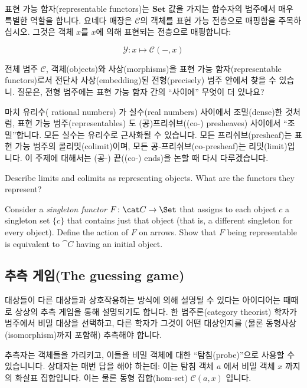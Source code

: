 \documentclass[DaoFP]{subfiles}
\begin{document}
표현 가능 함자(representable functors)는 $\mathbf{Set}$ 값을 가지는 함수자의 범주에서 매우 특별한 역할을 합니다. 요네다 매장은 $\mathcal{C}$의 객체를 표현 가능 전층으로 매핑함을 주목하십시오. 그것은 객체 $x$를 $x$에 의해 표현되는 전층으로 매핑합니다:

\[  \mathcal{Y} \colon x \mapsto \mathcal{C}(-, x) \]

전체 범주 $\mathcal{C}$, 객체(objects)와 사상(morphisms)을 표현 가능 함자(representable functors)로서 전단사 사상(embedding)된 전형(precisely) 범주 안에서 찾을 수 있습니.  
질문은, 전형 범주에는 표현 가능 함자 간의 ``사이에'' 무엇이 더 있나요?

마치 유리수( rational numbers) 가 실수(real numbers) 사이에서 조밀(dense)한 것처럼, 표현 가능 범주(representables) 도 (공)프리쉬브((co-) presheaves) 사이에서 ``조밀''합니다. 모든 실수는 유리수로 근사화될 수 있습니다. 모든 프리쉬브(presheaf)는 표현 가능 범주의 콜리밋(colimit)이며, 모든 공-프리쉬브(co-presheaf)는 리밋(limit)입니다. 이 주제에 대해서는 (공-) 끝((co-) ends)을 논할 때 다시 다루겠습니다.

\begin{exercise}
Describe limits and colimits as representing objects. What are the functors they represent?
\end{exercise}
\begin{exercise}
Consider a \emph{singleton functor} $F \colon \cat C \to \Set$ that assigns to each object $c$ a singleton set $\{c\}$ that contains just that object (that is, a different singleton for every object). Define the action of $F$ on arrows. Show that $F$ being representable is equivalent to $\cat C$ having an initial object.
\end{exercise}

\subsection{추측 게임(The guessing game)}

대상들이 다른 대상들과 상호작용하는 방식에 의해 설명될 수 있다는 아이디어는 때때로 상상의 추측 게임을 통해 설명되기도 합니다. 한 범주론(category theorist) 학자가 범주에서 비밀 대상을 선택하고, 다른 학자가 그것이 어떤 대상인지를 (물론 동형사상(isomorphism)까지 포함해) 추측해야 합니다.

추측자는 객체들을 가리키고, 이들을 비밀 객체에 대한 ``탐침(probe)''으로 사용할 수 있습니니다. 상대자는 매번 답을 해야 하는데: 이는 탐침 객체 $a$ 에서 비밀 객체 $x$ 까지의 화살표 집합입니다. 이는 물론 동형 집합(hom-set) $\mathcal{C}(a, x)$ 입니다.
\end{document}
